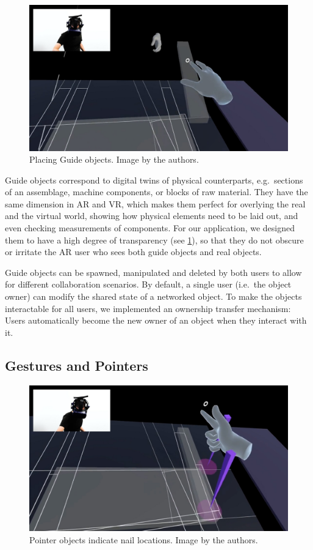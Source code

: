 \documentclass[10pt,twocolumn,letterpaper,english]{article}
\begin{document}
\begin{figure}[!htp]
    \centering
    \includegraphics[width=1\linewidth]{Guide Objects.jpg}
    \caption{Placing Guide objects. Image by the authors.}
    \label{fig:Objects}
\end{figure}

Guide objects correspond to digital twins of physical counterparts, e.g.\ sections of an assemblage, machine components, or blocks of raw material. They have the same dimension in AR and VR, which makes them perfect for overlying the real and the virtual world, showing how physical elements need to be laid out, and even checking measurements of components. For our application, we designed them to have a high degree of transparency (see \cref{fig:Objects}), so that they do not obscure or irritate the AR user who sees both guide objects and real objects.

Guide objects can be spawned, manipulated and deleted by both users to allow for different collaboration scenarios. By default, a single user (i.e.\ the object owner) can modify the shared state of a networked object. To make the objects interactable for all users, we implemented an ownership transfer mechanism: Users automatically become the new owner of an object when they interact with it. 

\subsection{Gestures and Pointers}

\begin{figure}[!htp]
    \centering
    \includegraphics[width=1\linewidth]{Pointers 2.jpg}
    \caption{Pointer objects indicate nail locations. Image by the authors.}
    \label{fig:pointers}
\end{figure}
\end{document}
